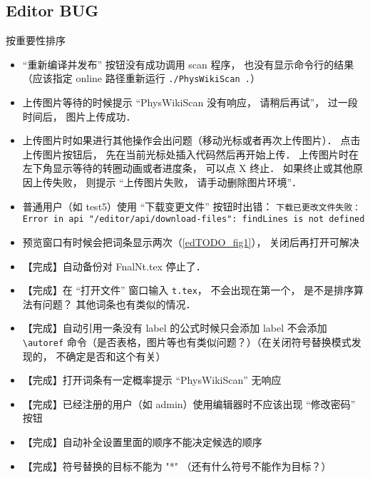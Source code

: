 \subsection{Editor BUG}
按重要性排序
\begin{itemize}
\item “重新编译并发布” 按钮没有成功调用 scan 程序， 也没有显示命令行的结果（应该指定 online 路径重新运行 \verb|./PhysWikiScan .|）

\item 上传图片等待的时候提示 “PhysWikiScan 没有响应， 请稍后再试”， 过一段时间后， 图片上传成功．

\item 上传图片时如果进行其他操作会出问题（移动光标或者再次上传图片）． 点击上传图片按钮后， 先在当前光标处插入代码然后再开始上传． 上传图片时在左下角显示等待的转圈动画或者进度条， 可以点 X 终止． 如果终止或其他原因上传失败， 则提示 “上传图片失败， 请手动删除图片环境”．

\item 普通用户（如 test5）使用 “下载变更文件” 按钮时出错： \verb|下载已更改文件失败：Error in api "/editor/api/download-files": findLines is not defined|

\item 预览窗口有时候会把词条显示两次（\autoref{edTODO_fig1}）， 关闭后再打开可解决

\item 【完成】自动备份对 FnalNt.tex 停止了．

\item 【完成】在 “打开文件” 窗口输入 \lstinline|t.tex|， 不会出现在第一个， 是不是排序算法有问题？ 其他词条也有类似的情况．

\item 【完成】自动引用一条没有 label 的公式时候只会添加 label 不会添加 \lstinline|\autoref| 命令（是否表格，图片等也有类似问题？）（在关闭符号替换模式发现的， 不确定是否和这个有关）

\item 【完成】打开词条有一定概率提示 “PhysWikiScan” 无响应

\item 【完成】已经注册的用户（如 admin）使用编辑器时不应该出现 “修改密码” 按钮

\item 【完成】自动补全设置里面的顺序不能决定候选的顺序

\item 【完成】符号替换的目标不能为 "*" （还有什么符号不能作为目标？）
\end{itemize}

